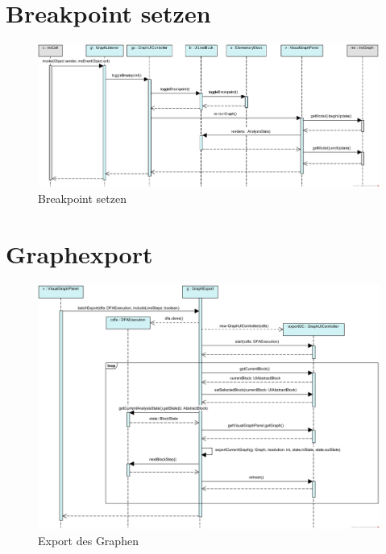 \section*{Breakpoint setzen}
\begin{figure}[H]
  \centering
    \includegraphics[width=1\textwidth]{Sequenzdiagramme/SetBreakpoint}
  \caption{Breakpoint setzen}
  \label{fig:breakpoint}
\end{figure}
\newpage


\section*{Graphexport}
\begin{figure}[H]
	\centering
	\includegraphics[width=1\textwidth]{Sequenzdiagramme/GraphExport}
	\caption{Export des Graphen}
	\label{fig:graphexport}
\end{figure}
\newpage
